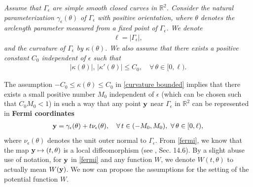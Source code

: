 \documentclass[10pt, reqno]{amsart}
\numberwithin{equation}{section}
\theoremstyle{definition}
\def\G{{\mathfrak G}}
\def\G{\Gamma}
\begin{document}
\smallskip{}
{\it
Assume that $\Gamma_\epsilon$ are simple smooth closed curves in ${\mathbb R}^2$.
Consider the natural parameterization $\gamma_\epsilon(\theta)$ of $\Gamma_\epsilon$ with positive orientation, where $\theta$ denotes the arclength parameter measured from a fixed point of $\Gamma_\epsilon$.
We denote
\begin{align}
\ell = |\Gamma_\epsilon|,
\label{ell-epsilon}
\end{align}
and the curvature of $\G_\epsilon$ by $\kappa(\theta)$.
We also assume that there exists a positive constant $C_0$ independent of $\epsilon$ such that
\begin{align} \label{curvature bounded}
|\kappa(\theta)|, \, |\kappa'(\theta)|\leq C_0,
\quad\forall\, \theta\in [0, \ell).
\end{align}
}

\smallskip
The assumption $-C_0\leq\kappa(\theta)\leq C_0$ in \eqref{curvature bounded} implies that
there exists a small positive number $M_0$ independent of $\epsilon$ (which can be chosen such that $C_0M_0<1$) in such a way that any point ${\bf y} $ near $\Gamma_\epsilon$ in ${\mathbb R}^2 $ can be represented in {\bf{Fermi coordinates}}
\begin{align}\label{fermi}
{\bf y}= \gamma_\epsilon(\theta) +t \nu_\epsilon(\theta), \quad \forall\,  t\in(-M_0, M_0),\ \forall\,\theta\in [0, \ell),
\end{align}
where $ \nu_\epsilon(\theta) $ denotes the unit outer normal to $\Gamma_\epsilon$.
From \eqref{fermi}, we know that the map
${\bf y} \mapsto (t, \theta)$ is a local diffeomorphism (see \cite{Gilbarg}, Sec. 14.6). By a slight abuse use of notation, for ${\bf y}$ in \eqref{fermi} and any function $W$, we denote $W(t, \theta)$ to actually mean $W({\bf y})$.
We now can propose the assumptions for the setting of the potential function $W$.
\end{document}
